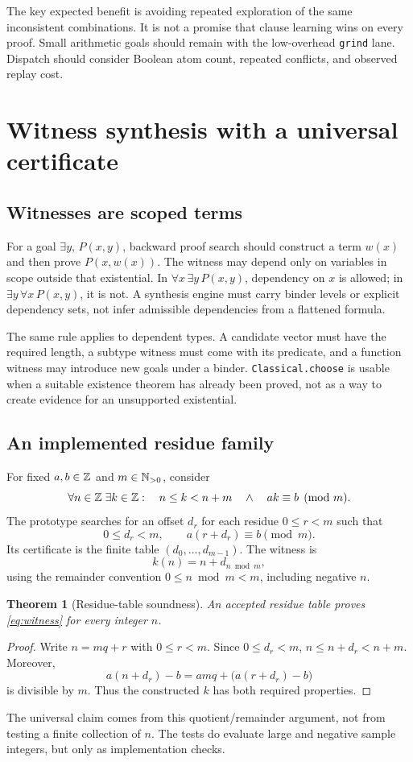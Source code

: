 \documentclass[11pt,letterpaper]{article}
\newcommand{\code}[1]{\texttt{#1}}
\newtheorem{theorem}{Theorem}[section]
\theoremstyle{definition}\newtheorem{definition}[theorem]{Definition}
\theoremstyle{remark}\newtheorem{remark}[theorem]{Remark}
\begin{document}
The key expected benefit is avoiding repeated exploration of the same inconsistent combinations. It is not a promise that clause learning wins on every proof. Small arithmetic goals should remain with the low-overhead \code{grind} lane. Dispatch should consider Boolean atom count, repeated conflicts, and observed replay cost.

\section{Witness synthesis with a universal certificate}
\subsection{Witnesses are scoped terms}
For a goal $\exists y,\,P(x,y)$, backward proof search should construct a term $w(x)$ and then prove $P(x,w(x))$. The witness may depend only on variables in scope outside that existential. In
$\forall x\,\exists y\,P(x,y)$, dependency on $x$ is allowed; in
$\exists y\,\forall x\,P(x,y)$, it is not. A synthesis engine must carry binder levels or explicit dependency sets, not infer admissible dependencies from a flattened formula.

The same rule applies to dependent types. A candidate vector must have the required length, a subtype witness must come with its predicate, and a function witness may introduce new goals under a binder. \code{Classical.choose} is usable when a suitable existence theorem has already been proved, not as a way to create evidence for an unsupported existential.

\subsection{An implemented residue family}
For fixed $a,b\in\mathbb{Z}$ and $m\in\mathbb{N}_{>0}$, consider
\begin{equation}\label{eq:witness}
 \forall n\in\mathbb{Z}\;\exists k\in\mathbb{Z}:\quad
 n\le k<n+m\quad\land\quad ak\equiv b\pmod m.
\end{equation}
The prototype searches for an offset $d_r$ for each residue $0\le r<m$ such that
\[
 0\le d_r<m,\qquad a(r+d_r)\equiv b\pmod m.
\]
Its certificate is the finite table $(d_0,\ldots,d_{m-1})$. The witness is
\[
 k(n)=n+d_{n\bmod m},
\]
using the remainder convention $0\le n\bmod m<m$, including negative $n$.

\begin{theorem}[Residue-table soundness]
An accepted residue table proves \eqref{eq:witness} for every integer $n$.
\end{theorem}
\begin{proof}
Write $n=mq+r$ with $0\le r<m$. Since $0\le d_r<m$, $n\le n+d_r<n+m$. Moreover,
\[
 a(n+d_r)-b=amq+\bigl(a(r+d_r)-b\bigr)
\]
is divisible by $m$. Thus the constructed $k$ has both required properties.
\end{proof}
The universal claim comes from this quotient/remainder argument, not from testing a finite collection of $n$. The tests do evaluate large and negative sample integers, but only as implementation checks.
\end{document}

